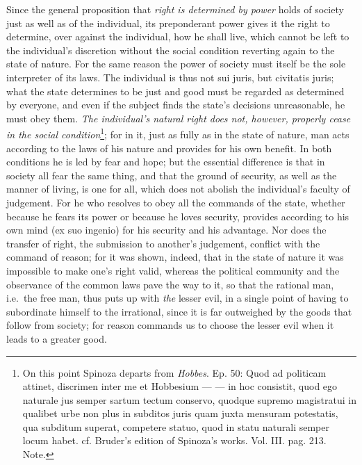 \documentclass[12pt,a4paper,openany]{book}
\newcommand{\opage}[1]{\marginnote{\footnotesize\textit{[#1]}}}
\begin{document}
\opage{139}\setcounter{footnote}{0}Since the general proposition that \emph{right is determined by power} holds of society just as well as of the individual, its preponderant power gives it the right to determine, over against the individual, how he shall live, which cannot be left to the individual's discretion without the social condition reverting again to the state of nature. For the same reason the power of society must itself be the sole interpreter of its laws. The individual is thus not sui juris, but civitatis juris; what the state determines to be just and good must be regarded as determined by everyone, and even if the subject finds the state's decisions unreasonable, he must obey them. \emph{The individual's natural right does not, however, properly cease in the social condition}\footnote{On this point Spinoza departs from \emph{Hobbes}. Ep. 50: Quod ad politicam attinet, discrimen inter me et Hobbesium --- --- in hoc consistit, quod ego naturale jus semper sartum tectum conservo, quodque supremo magistratui in qualibet urbe non plus in subditos juris quam juxta mensuram potestatis, qua subditum superat, competere statuo, quod in statu naturali semper locum habet. cf. Bruder's edition of Spinoza's works. Vol. III. pag. 213. Note.}; for in it, just as fully as in the state of nature, man acts according to the laws of his nature and provides for his own benefit. In both conditions he is led by fear and hope; but the essential difference is that in society all fear the same thing, and that the ground of security, as well as the manner of living, is one for all, which does not abolish the individual's faculty of judgement. For he who resolves to obey all the commands of the state, whether because he fears its power or because he loves security, provides according to his own mind (ex suo ingenio) for his security and his advantage. Nor does the transfer of right, the submission to another's judgement, conflict with the command of reason; for it was shown, indeed, that in the state of nature it was impossible to make one's right valid, whereas the political community and the observance of the common laws pave the way to it, so that the rational man, i.e.\ the free man, thus puts up with \emph{the} lesser evil, in a single point
\opage{140}\setcounter{footnote}{0}of having to subordinate himself to the irrational, since it is far outweighed by the goods that follow from society; for reason commands us to choose the lesser evil when it leads to a greater good.
\end{document}
